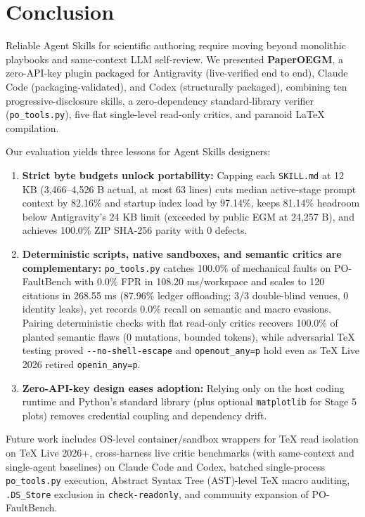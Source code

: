\section{Conclusion}\label{sec:conclusion}

Reliable Agent Skills for scientific authoring require moving beyond monolithic playbooks and same-context LLM self-review. We presented \textbf{PaperOEGM}, a zero-API-key plugin packaged for Antigravity (live-verified end to end), Claude Code (packaging-validated), and Codex (structurally packaged), combining ten progressive-disclosure skills, a zero-dependency standard-library verifier (\texttt{po\_\allowbreak{}tools.\allowbreak{}py}), five flat single-level read-only critics, and paranoid LaTeX compilation.

Our evaluation yields three lessons for Agent Skills designers:

\begin{enumerate}
\def\labelenumi{\arabic{enumi}.}
\item
  \textbf{Strict byte budgets unlock portability:} Capping each \texttt{SKILL.\allowbreak{}md} at 12 KB (3,466--4,526 B actual, at most 63 lines) cuts median active-stage prompt context by 82.16\% and startup index load by 97.14\%, keeps 81.14\% headroom below Antigravity's 24 KB limit (exceeded by public EGM at 24,257 B), and achieves 100.0\% ZIP SHA-256 parity with 0 defects.
\item
  \textbf{Deterministic scripts, native sandboxes, and semantic critics are complementary:} \texttt{po\_\allowbreak{}tools.\allowbreak{}py} catches 100.0\% of mechanical faults on PO-FaultBench with 0.0\% FPR in 108.20 ms/workspace and scales to 120 citations in 268.55 ms (87.96\% ledger offloading; 3/3 double-blind venues, 0 identity leaks), yet records 0.0\% recall on semantic and macro evasions. Pairing deterministic checks with flat read-only critics recovers 100.0\% of planted semantic flaws (0 mutations, bounded tokens), while adversarial TeX testing proved \texttt{\mbox{-{}-}no-\allowbreak{}shell-escape} and \texttt{openout\_\allowbreak{}any=p} hold even as TeX Live 2026 retired \texttt{openin\_\allowbreak{}any=p}.
\item
  \textbf{Zero-API-key design eases adoption:} Relying only on the host coding runtime and Python's standard library (plus optional \texttt{matplotlib} for Stage 5 plots) removes credential coupling and dependency drift.
\end{enumerate}

Future work includes OS-level container/sandbox wrappers for TeX read isolation on TeX Live 2026+, cross-harness live critic benchmarks (with same-context and single-agent baselines) on Claude Code and Codex, batched single-process \texttt{po\_\allowbreak{}tools.\allowbreak{}py} execution, Abstract Syntax Tree (AST)-level TeX macro auditing, \texttt{.DS\_\allowbreak{}Store} exclusion in \texttt{check-readonly}, and community expansion of PO-FaultBench.
